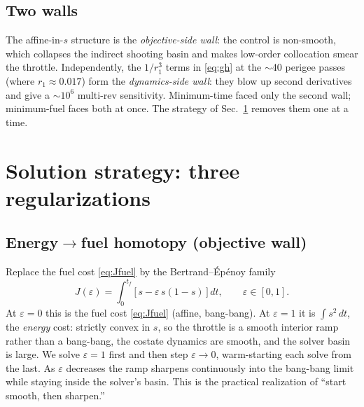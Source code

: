 \documentclass[11pt]{article}
\newcommand{\dt}{\,dt}
\begin{document}
\subsection{Two walls}
The affine-in-$s$ structure is the \emph{objective-side wall}: the control is
non-smooth, which collapses the indirect shooting basin and makes low-order
collocation smear the throttle. Independently, the $1/r_1^3$ terms in
\eqref{eq:gh} at the $\sim$40 perigee passes (where $r_1\approx0.017$) form the
\emph{dynamics-side wall}: they blow up second derivatives and give a
$\sim\!10^6$ multi-rev sensitivity. Minimum-time faced only the second wall;
minimum-fuel faces both at once. The strategy of Sec.~\ref{sec:strategy}
removes them one at a time.

\section{Solution strategy: three regularizations}
\label{sec:strategy}

\subsection{Energy\texorpdfstring{$\to$}{->}fuel homotopy (objective wall)}
Replace the fuel cost \eqref{eq:Jfuel} by the Bertrand--\'Ep\'enoy family
\begin{equation}
J(\varepsilon)=\int_0^{t_f}\!\big[\,s-\varepsilon\,s(1-s)\,\big]\dt,
\qquad \varepsilon\in[0,1].
\label{eq:homotopy}
\end{equation}
At $\varepsilon=0$ this is the fuel cost \eqref{eq:Jfuel} (affine, bang-bang).
At $\varepsilon=1$ it is $\int s^2\dt$, the \emph{energy} cost: strictly convex
in $s$, so the throttle is a smooth interior ramp rather than a bang-bang, the
costate dynamics are smooth, and the solver basin is large. We solve
$\varepsilon=1$ first and then step $\varepsilon\to0$, warm-starting each solve
from the last. As $\varepsilon$ decreases the ramp sharpens continuously into
the bang-bang limit while staying inside the solver's basin. This is the
practical realization of ``start smooth, then sharpen.''
\end{document}
